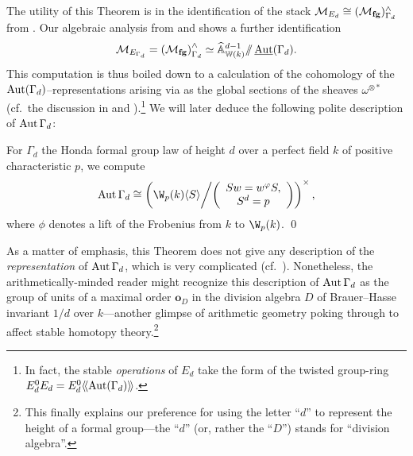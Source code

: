 The utility of this Theorem is in the identification of the stack $\mathcal{M}_{E_d} \cong (\mathcal{M}_{\mathbf{fg}})^\wedge_{\Gamma_d}$ from .  Our algebraic analysis from  and  shows a further identification \[\mathcal{M}_{E_{\Gamma_d}} = \left( \mathcal{M}_{\mathbf{fg}} \right)^\wedge_{\Gamma_d} \simeq \widehat{\mathbb A}^{d-1}_{\mathbb W(k)} /\!\!/ \operatorname{\underline{\smash{\operatorname{Aut}}}}(\Gamma_d).\]  This computation is thus boiled down to a calculation of the cohomology of the $\operatorname{Aut}(\Gamma_d)$--representations arising via  as the global sections of the sheaves $\omega^{\otimes *}$ (cf.\ the discussion in  and ).\footnote{In fact, the stable \emph{operations} of $E_d$ take the form of the twisted group-ring $E_d^0 E_d = E_d^0\langle\!\langle\operatorname{Aut}(\Gamma_d)\rangle\!\rangle$.}  We will later deduce the following polite description of $\operatorname{Aut} \Gamma_d$:
\begin{theorem}
For $\Gamma_d$ the Honda formal group law of height $d$ over a perfect field $k$ of positive characteristic $p$, we compute \[\Aut \Gamma_d \cong \left( \W_p(k) \<S\> \middle/ \left( \begin{array}{c} Sw = w^\phi S, \\ S^d = p \end{array} \right) \right)^\times,\] where $\phi$ denotes a lift of the Frobenius from $k$ to $\W_p(k)$. \qed
\end{theorem}

\begin{remark}\label{StablizerRepIsComplicated}
As a matter of emphasis, this Theorem does not give any description of the \emph{representation} of $\operatorname{Aut} \Gamma_d$, which is very complicated (cf.\ ).  Nonetheless, the arithmetically-minded reader might recognize this description of $\operatorname{Aut} \Gamma_d$ as the group of units of a maximal order $\mathbf o_D$ in the division algebra $D$ of Brauer--Hasse invariant $1/d$ over $k$---another glimpse of arithmetic geometry poking through to affect stable homotopy theory.\footnote{This finally explains our preference for using the letter ``$d$'' to represent the height of a formal group---the ``$d$'' (or, rather the ``$D$'') stands for ``division algebra''.}
\end{remark}

